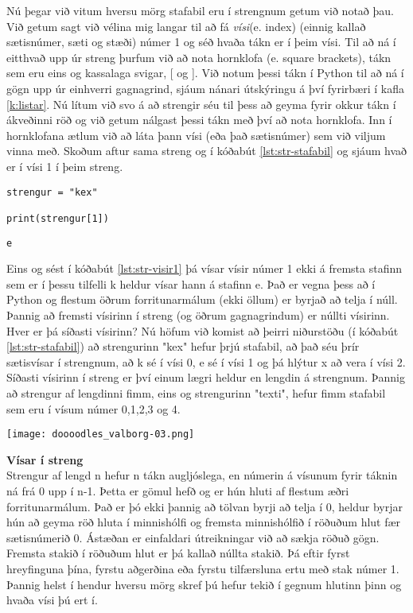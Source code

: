 Nú þegar við vitum hversu mörg stafabil eru í strengnum getum við notað þau.
Við getum sagt við vélina mig langar til að fá \emph{vísi}(e. index) (einnig kallað sætisnúmer, sæti og stæði) númer 1 og séð hvaða tákn er í þeim vísi.
Til að ná í eitthvað upp úr streng þurfum við að nota hornklofa (e. square brackets), tákn sem eru eins og kassalaga svigar, [ og ].
Við notum þessi tákn í Python til að ná í gögn upp úr einhverri gagnagrind, sjáum nánari útskýringu á því fyrirbæri í kafla \ref{k:listar}.
Nú lítum við svo á að strengir séu til þess að geyma fyrir okkur tákn í ákveðinni röð og við getum nálgast þessi tákn með því að nota hornklofa.
Inn í hornklofana ætlum við að láta þann vísi (eða það sætisnúmer) sem við viljum vinna með.
Skoðum aftur sama streng og í kóðabút \ref{lst:str-stafabil} og sjáum hvað er í vísi 1 í þeim streng.
\begin{lstlisting}[caption=Vísir 1, label=lst:str-visir1]
strengur = "kex"

print(strengur[1])
\end{lstlisting}
\lstset{style=uttak}
\begin{lstlisting}
e
\end{lstlisting}
\lstset{style=venjulegt}

Eins og sést í kóðabút \ref{lst:str-visir1} þá vísar vísir númer 1 ekki á fremsta stafinn sem er í þessu tilfelli k heldur vísar hann á stafinn e.
Það er vegna þess að í Python og flestum öðrum forritunarmálum (ekki öllum) er byrjað að telja í núll.
Þannig að fremsti vísirinn í streng (og öðrum gagnagrindum) er núllti vísirinn.
Hver er þá síðasti vísirinn?
Nú höfum við komist að þeirri niðurstöðu (í kóðabút \ref{lst:str-stafabil}) að strengurinn "kex" hefur þrjú stafabil, að það séu þrír sætisvísar í strengnum, að k sé í vísi 0, e sé í vísi 1 og þá hlýtur x að vera í vísi 2.
Síðasti vísirinn í streng er því einum lægri heldur en lengdin á strengnum.
Þannig að strengur af lengdinni fimm, eins og strengurinn "texti", hefur fimm stafabil sem eru í vísum númer 0,1,2,3 og 4.
\vspace{1cm}
\begin{center}
	\texttt{[image: doooodles\_valborg-03.png]}
\end{center}
\newpage
\begin{itarefni}
\textbf{Vísar í streng}\\
Strengur af lengd n hefur n tákn augljóslega, en númerin á vísunum fyrir táknin ná frá 0 upp í n-1.
Þetta er gömul hefð og er hún hluti af flestum æðri forritunarmálum.
Það er þó ekki þannig að tölvan byrji að telja í 0, heldur byrjar hún að geyma röð hluta í minnishólfi og fremsta minnishólfið í röðuðum hlut fær sætisnúmerið 0.
Ástæðan er einfaldari útreikningar við að sækja röðuð gögn.
Fremsta stakið í röðuðum hlut er þá kallað núllta stakið.
Þá eftir fyrst hreyfinguna þína, fyrstu aðgerðina eða fyrstu tilfærsluna ertu með stak númer 1.
Þannig helst í hendur hversu mörg skref þú hefur tekið í gegnum hlutinn þinn og hvaða vísi þú ert í.
\end{itarefni}

